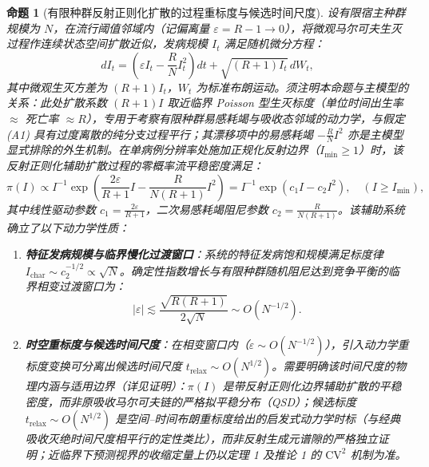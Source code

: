 \documentclass[11pt,a4paper]{article}
\theoremstyle{plain}
\newtheorem{proposition}[theorem]{命题}
\theoremstyle{definition}
\begin{document}
\begin{proposition}[有限种群反射正则化扩散的过程重标度与候选时间尺度]\label{prop:qsd}
设有限宿主种群规模为 $N$，在流行阈值邻域内（记偏离量 $\varepsilon = R - 1 \to 0$），将微观马尔可夫生灭过程作连续状态空间扩散近似，发病规模 $I_t$ 满足随机微分方程：
\begin{equation}
dI_t = \left(\varepsilon I_t - \frac{R}{N}I_t^2\right) dt + \sqrt{(R+1)I_t}\, dW_t,
\end{equation}
其中微观生灭方差为 $(R+1)I_t$，$W_t$ 为标准布朗运动。须注明本命题与主模型的关系：此处扩散系数 $(R+1)I$ 取近临界 Poisson 型生灭标度（单位时间出生率 $\approx$ 死亡率 $\approx R$），专用于考察有限种群易感耗竭与吸收态邻域的动力学，与假定 (A1) 具有过度离散的纯分支过程平行；其漂移项中的易感耗竭 $-\frac{R}{N}I^2$ 亦是主模型显式排除的外生机制。在单病例分辨率处施加正规化反射边界（$I_{\min} \ge 1$）时，该反射正则化辅助扩散过程的零概率流平稳密度满足：
\begin{equation}
\pi(I) \propto I^{-1} \exp\left( \frac{2\varepsilon}{R+1}I - \frac{R}{N(R+1)}I^2 \right) = I^{-1} \exp\left( c_1 I - c_2 I^2 \right), \quad (I \ge I_{\min}),
\label{eq:qsd_density}
\end{equation}
其中线性驱动参数 $c_1 = \frac{2\varepsilon}{R+1}$，二次易感耗竭阻尼参数 $c_2 = \frac{R}{N(R+1)}$。该辅助系统确立了以下动力学性质：
\begin{enumerate}
\item \textbf{特征发病规模与临界慢化过渡窗口}：系统的特征发病饱和规模满足标度律 $I_{\text{char}} \sim c_2^{-1/2} \propto \sqrt{N}$。确定性指数增长与有限种群随机阻尼达到竞争平衡的临界相变过渡窗口为：
\begin{equation}
|\varepsilon| \lesssim \frac{\sqrt{R(R+1)}}{2\sqrt{N}} \sim O(N^{-1/2}).
\end{equation}
\item \textbf{时空重标度与候选时间尺度}：在相变窗口内（$\varepsilon \sim O(N^{-1/2})$），引入动力学重标度变换可分离出候选时间尺度 $t_{\text{relax}} \sim O(N^{1/2})$。需要明确该时间尺度的物理内涵与适用边界（详见证明）：$\pi(I)$ 是带反射正则化边界辅助扩散的平稳密度，而非原吸收马尔可夫链的严格拟平稳分布（QSD）；候选标度 $t_{\text{relax}} \sim O(N^{1/2})$ 是空间--时间布朗重标度给出的启发式动力学时标（与经典吸收灭绝时间尺度相平行的定性类比），而非反射生成元谱隙的严格独立证明；近临界下预测视界的收缩定量上仍以定理 1 及推论 1 的 $\text{CV}^2$ 机制为准。
\end{enumerate}
\end{proposition}
\end{document}
